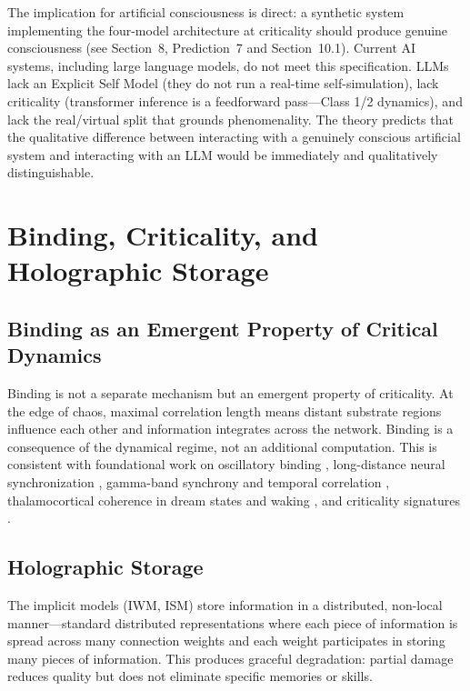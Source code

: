 \documentclass[12pt]{article}
\begin{document}
The implication for artificial consciousness is direct: a synthetic system implementing the four-model architecture at criticality should produce genuine consciousness (see Section~8, Prediction~7 and Section~10.1). Current AI systems, including large language models, do not meet this specification. LLMs lack an Explicit Self Model (they do not run a real-time self-simulation), lack criticality (transformer inference is a feedforward pass---\hspace{0pt}Class 1/2 dynamics), and lack the real/virtual split that grounds phenomenality. The theory predicts that the qualitative difference between interacting with a genuinely conscious artificial system and interacting with an LLM would be immediately and qualitatively distinguishable.



\section{Binding, Criticality, and Holographic Storage}


\subsection{Binding as an Emergent Property of Critical Dynamics}

Binding is not a separate mechanism but an emergent property of criticality. At the edge of chaos, maximal correlation length means distant substrate regions influence each other and information integrates across the network. Binding is a consequence of the dynamical regime, not an additional computation. This is consistent with foundational work on oscillatory binding \citep{Gray1989}, long-distance neural synchronization \citep{Rodriguez1999}, gamma-band synchrony and temporal correlation \citep{Singer1995,Fries2005,Fries2015}, thalamocortical coherence in dream states \citep{Llinas1993} and waking \citep{Llinas1998}, and criticality signatures \citep{Beggs2003,Tagliazucchi2012}.


\subsection{Holographic Storage}

The implicit models (IWM, ISM) store information in a distributed, non-local manner---\hspace{0pt}standard distributed representations \citep{Hinton1986} where each piece of information is spread across many connection weights and each weight participates in storing many pieces of information. This produces graceful degradation: partial damage reduces quality but does not eliminate specific memories or skills.
\end{document}
